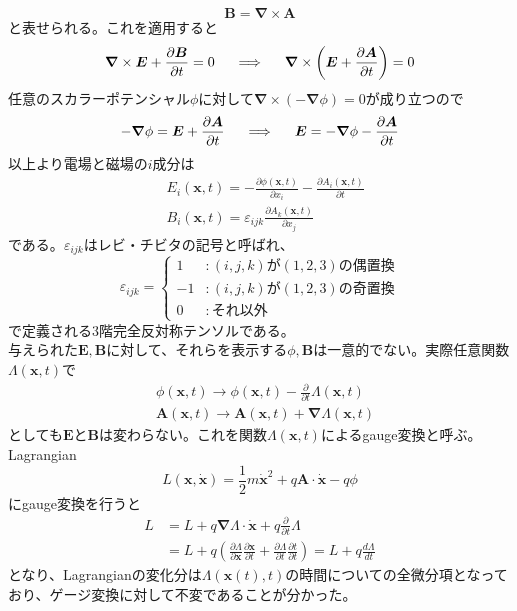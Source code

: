\documentclass{jsarticle}
\begin{document}
\[\bm{B}=\bm{\nabla}\times\bm{A}\]
と表せられる。これを適用すると
\[\bm{\nabla}\times\bm{E}+\frac{\partial\bm{B}}{\partial t}=0\hspace{5mm}\Longrightarrow\hspace{5mm}\bm{\nabla}\times\left(\bm{E}+\frac{\partial\bm{A}}{\partial t}\right)=0\]
任意のスカラーポテンシャル\(\phi\)に対して\(\bm{\nabla}\times(-\bm{\nabla}\phi)=0\)が成り立つので
\[-\bm{\nabla}\phi=\bm{E}+\frac{\partial\bm{A}}{\partial t}\hspace{5mm}\Longrightarrow\hspace{5mm}\bm{E}=-\bm{\nabla}\phi-\frac{\partial\bm{A}}{\partial t}\]
以上より電場と磁場の\(i\)成分は
\begin{align*}
&E_{i}(\bm{x},t)=-\frac{\partial\phi(\bm{x},t)}{\partial x_{i}}-\frac{\partial A_{i}(\bm{x},t)}{\partial t}\\
&B_{i}(\bm{x},t)=\varepsilon_{ijk}\frac{\partial A_{k}(\bm{x},t)}{\partial x_{j}}
\end{align*}
である。\(\varepsilon_{ijk}\)はレビ・チビタの記号と呼ばれ、
\[\varepsilon_{ijk}=\begin{cases}
1 & :(i,j,k)が(1,2,3)の偶置換\\
-1 & :(i,j,k)が(1,2,3)の奇置換\\
0 & :それ以外\end{cases}\]
で定義される\(3\)階完全反対称テンソルである。\\
与えられた\(\bm{E},\bm{B}\)に対して、それらを表示する\(\phi,\bm{B}\)は一意的でない。実際任意関数\(\Lambda(\bm{x},t)\)で
\begin{align*}
&\phi(\bm{x},t)\longrightarrow\phi(\bm{x},t)-\frac{\partial}{\partial t}\Lambda(\bm{x},t)\\
&\bm{A}(\bm{x},t)\longrightarrow\bm{A}(\bm{x},t)+\bm{\nabla}\Lambda(\bm{x},t)
\end{align*}
としても\(\bm{E}\)と\(\bm{B}\)は変わらない。これを関数\(\Lambda(\bm{x},t)\)によるgauge変換と呼ぶ。\\
Lagrangian
\[L(\bm{x},\dot{\bm{x}})=\frac{1}{2}m\dot{\bm{x}}^{2}+q\bm{A}\cdot\dot{\bm{x}}-q\phi\]
にgauge変換を行うと
\begin{align*}
L&=L+q\bm{\nabla}\Lambda\cdot\dot{\bm{x}}+q\frac{\partial}{\partial t}\Lambda\\
&=L+q\left(\frac{\partial\Lambda}{\partial\bm{x}}\frac{\partial\bm{x}}{\partial t}+\frac{\partial\Lambda}{\partial t}\frac{\partial t}{\partial t}\right)=L+q\frac{d\Lambda}{dt}
\end{align*}
となり、Lagrangianの変化分は\(\Lambda(\bm{x}(t),t)\)の時間についての全微分項となっており、ゲージ変換に対して不変であることが分かった。\\
\end{document}
